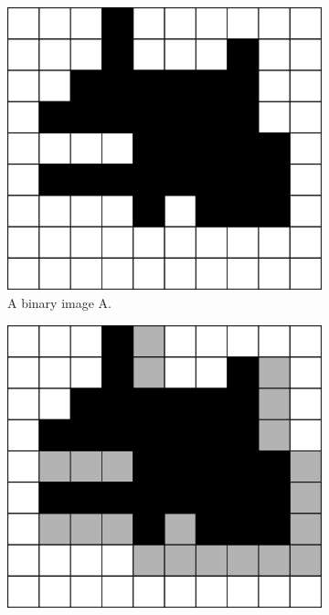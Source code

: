 \documentclass[
  digital,     %
  oneside,     %
  nosansbold,  %
  nocolorbold, %
  lof,         %
  lot,         %
]{fithesis4}
\begin{document}
\begin{figure}
    \begin{subfigure}[t]{0.4\textwidth}
        \centering
        \includegraphics[width=\textwidth]{resources/inkscape/closing_orig.png}
        \caption{A binary image A.}
        \label{fig:closing_orig}
    \end{subfigure}
    \begin{subfigure}[t]{0.4\textwidth}
        \centering
        \includegraphics[width=\textwidth]{resources/inkscape/closing_dilation.png}

\end{subfigure}
\end{figure}
\end{document}
